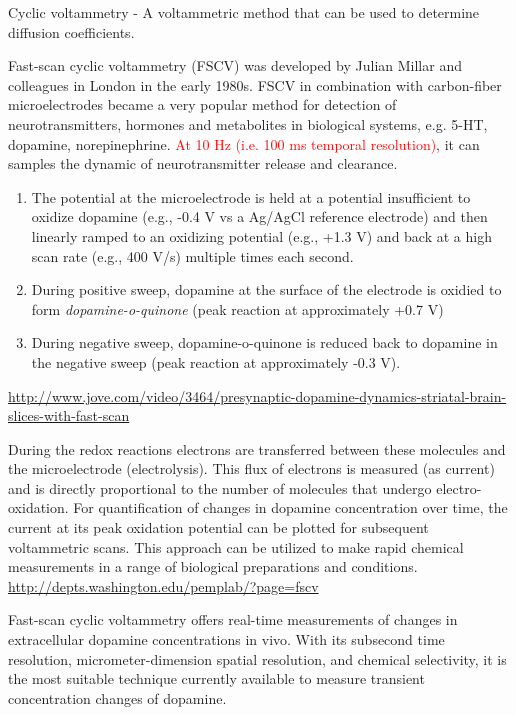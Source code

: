 Cyclic voltammetry - A voltammetric method that can be used to determine
diffusion coefficients.

Fast-scan cyclic voltammetry (FSCV) was developed by Julian Millar and
colleagues in London in the early 1980s.  FSCV in combination with carbon-fiber
microelectrodes became a very popular method for detection of neurotransmitters,
hormones and metabolites in biological systems, e.g. 5-HT, dopamine,
norepinephrine. \textcolor{red}{At 10 Hz (i.e. 100 ms temporal resolution)}, it
can samples the dynamic of neurotransmitter release and clearance.
\begin{enumerate}
  \item  The potential at the microelectrode is held at a potential insufficient to
oxidize dopamine (e.g., -0.4 V vs a Ag/AgCl reference electrode) and then
linearly ramped to an oxidizing potential (e.g., +1.3 V) and back at a high scan
rate (e.g., 400 V/s) multiple times each second.

  \item During positive sweep, dopamine at the surface of the electrode is
  oxidied to form {\it dopamine-o-quinone} (peak reaction at approximately +0.7
  V)

  \item During negative sweep, dopamine-o-quinone is
  reduced back to dopamine in the negative sweep (peak reaction at approximately
  -0.3 V).
\end{enumerate}
\url{http://www.jove.com/video/3464/presynaptic-dopamine-dynamics-striatal-brain-slices-with-fast-scan}

During the redox reactions electrons are transferred between these molecules and
the microelectrode (electrolysis).
This flux of electrons is measured (as current) and is directly proportional to
the number of molecules that undergo electro-oxidation.
 For quantification of changes in dopamine concentration over time, the current
at its peak oxidation potential can be plotted for subsequent voltammetric
scans. This approach can be utilized to make rapid chemical measurements in a
range of biological preparations and conditions.
\url{http://depts.washington.edu/pemplab/?page=fscv}

Fast-scan cyclic voltammetry offers real-time measurements of changes in
extracellular dopamine concentrations in vivo. With its subsecond time
resolution, micrometer-dimension spatial resolution, and chemical selectivity,
it is the most suitable technique currently available to measure transient
concentration changes of dopamine.



